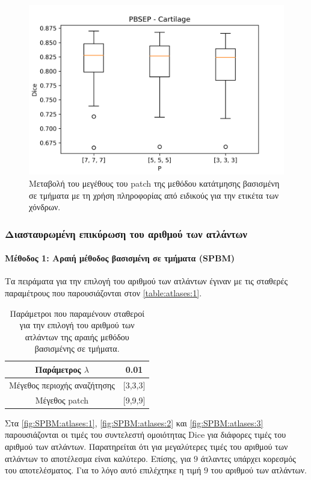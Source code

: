 \documentclass[a4paper,12pt]{article}
\newcommand{\paragraphLine}[1]{\paragraph{#1}\mbox{}}
\begin{document}
\begin{figure}[H]
    \centering
    \includegraphics[width=0.85\linewidth]{PBSEP_P_Cartilage_plot.png}
    \caption{Μεταβολή του μεγέθους του patch της μεθόδου κατάτμησης βασισμένη σε
             τμήματα με τη χρήση πληροφορίας από ειδικούς για την ετικέτα των
             χόνδρων.}
    \label{fig:PBSEP:P:3}
\end{figure}

\subsubsection{Διασταυρωμένη επικύρωση του αριθμού των ατλάντων}

\paragraphLine{Μέθοδος 1: Αραιή μέθοδος βασισμένη σε τμήματα (SPBM)}

Τα πειράματα για την επιλογή του αριθμού των ατλάντων έγιναν με τις σταθερές
παραμέτρους που παρουσιάζονται στον \autoref{table:atlases:1}.

\begin{table}[h!]
    \centering
    \begin{tabular}{|c|c|} 
        \hline
        Παράμετρος $\lambda$ & 0.01 \\ 
        \hline
        Μέγεθος περιοχής αναζήτησης & [3,3,3] \\ 
        \hline
        Μέγεθος patch & [9,9,9] \\ 
        \hline
    \end{tabular}
    \caption{Παράμετροι που παραμένουν σταθεροί για την επιλογή του αριθμού των
             ατλάντων της αραιής μεθόδου βασισμένης σε τμήματα.}
    \label{table:atlases:1}
\end{table}

Στα \autoref{fig:SPBM:atlases:1}, \autoref{fig:SPBM:atlases:2} και
\autoref{fig:SPBM:atlases:3} παρουσιάζονται οι τιμές του συντελεστή ομοιότητας
Dice για διάφορες τιμές του αριθμού των ατλάντων. Παρατηρείται ότι για
μεγαλύτερες τιμές του αριθμού των ατλάντων το αποτέλεσμα είναι καλύτερο. Επίσης,
για $9$ άτλαντες υπάρχει κορεσμός του αποτελέσματος. Για το λόγο αυτό επιλέχτηκε
η τιμή $9$ του αριθμού των ατλάντων.
\end{document}

